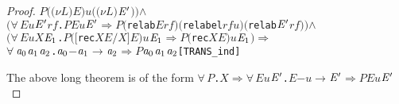 \documentclass[GCNS]{yincog}
\renewcommand{\HOLinline}[1]{\mbox{\textup{\texttt{#1}}}}
\renewcommand{\HOLConst}[1]{\texttt{#1}}
\renewcommand{\HOLBoundVar}[1]{\ensuremath{\mathit{#1}}}
\renewcommand{\HOLFreeVar}[1]{\ensuremath{\mathit{#1}}}
\renewcommand{\HOLSymConst}[1]{#1}
\renewcommand{\HOLTokenConj}{\ensuremath{\wedge}}
\renewcommand{\HOLTokenForall}{\ensuremath{\forall \,}}
\theoremstyle{remark}
\theoremstyle{theorem}
\theoremstyle{remark}
\newcommand{\HOLTokenTransBegin}{$-$}
\newcommand{\HOLTokenTransEnd}{$\rightarrow$\xspace}
\renewcommand{\HOLTokenImp}{\ensuremath{\Longrightarrow}}
\begin{document}
\begin{proof}
\begin{alltt}
            \HOLBoundVar{P} \ensuremath{(}\ensuremath{(\nu}\HOLBoundVar{L}\ensuremath{)} \HOLBoundVar{E}\ensuremath{)} \HOLBoundVar{u} \ensuremath{(}\ensuremath{(\nu}\HOLBoundVar{L}\ensuremath{)} \ensuremath{\HOLBoundVar{E}\sp{\prime}}\ensuremath{)}\ensuremath{)} \HOLSymConst{\HOLTokenConj{}}
       \ensuremath{(}\HOLSymConst{\HOLTokenForall{}}\HOLBoundVar{E} \HOLBoundVar{u} \ensuremath{\HOLBoundVar{E}\sp{\prime}} \HOLBoundVar{rf}. \HOLBoundVar{P} \HOLBoundVar{E} \HOLBoundVar{u} \ensuremath{\HOLBoundVar{E}\sp{\prime}} \HOLSymConst{\HOLTokenImp{}} \HOLBoundVar{P} \ensuremath{(}\HOLConst{relab} \HOLBoundVar{E} \HOLBoundVar{rf}\ensuremath{)} \ensuremath{(}\HOLConst{relabel} \HOLBoundVar{rf} \HOLBoundVar{u}\ensuremath{)} \ensuremath{(}\HOLConst{relab} \ensuremath{\HOLBoundVar{E}\sp{\prime}} \HOLBoundVar{rf}\ensuremath{)}\ensuremath{)} \HOLSymConst{\HOLTokenConj{}}
       \ensuremath{(}\HOLSymConst{\HOLTokenForall{}}\HOLBoundVar{E} \HOLBoundVar{u} \HOLBoundVar{X} \ensuremath{\HOLBoundVar{E}\sb{\mathrm{1}}}. \HOLBoundVar{P} \ensuremath{(}\ensuremath{[}\HOLConst{rec} \HOLBoundVar{X} \HOLBoundVar{E}\ensuremath{/}\HOLBoundVar{X}\ensuremath{]} \HOLBoundVar{E}\ensuremath{)} \HOLBoundVar{u} \ensuremath{\HOLBoundVar{E}\sb{\mathrm{1}}} \HOLSymConst{\HOLTokenImp{}} \HOLBoundVar{P} \ensuremath{(}\HOLConst{rec} \HOLBoundVar{X} \HOLBoundVar{E}\ensuremath{)} \HOLBoundVar{u} \ensuremath{\HOLBoundVar{E}\sb{\mathrm{1}}}\ensuremath{)} \HOLSymConst{\HOLTokenImp{}}
       \HOLSymConst{\HOLTokenForall{}}\ensuremath{\HOLBoundVar{a}\sb{\mathrm{0}}} \ensuremath{\HOLBoundVar{a}\sb{\mathrm{1}}} \ensuremath{\HOLBoundVar{a}\sb{\mathrm{2}}}. \ensuremath{\HOLBoundVar{a}\sb{\mathrm{0}}} \HOLTokenTransBegin\ensuremath{\HOLBoundVar{a}\sb{\mathrm{1}}}\HOLTokenTransEnd \ensuremath{\HOLBoundVar{a}\sb{\mathrm{2}}} \HOLSymConst{\HOLTokenImp{}} \HOLBoundVar{P} \ensuremath{\HOLBoundVar{a}\sb{\mathrm{0}}} \ensuremath{\HOLBoundVar{a}\sb{\mathrm{1}}} \ensuremath{\HOLBoundVar{a}\sb{\mathrm{2}}}\hfill{[TRANS\_ind]}
\end{alltt}
%
The above long theorem is of the form
\HOLinline{\HOLSymConst{\HOLTokenForall{}}\HOLBoundVar{P}.\\\;\HOLFreeVar{X}\\\;\HOLSymConst{\HOLTokenImp{}}\\\;\HOLSymConst{\HOLTokenForall{}}\HOLBoundVar{E}\\\;\HOLBoundVar{u}\\\;\ensuremath{\HOLBoundVar{E}\sp{\prime}}.\\\;\HOLBoundVar{E}\\\;\HOLTokenTransBegin \HOLBoundVar{u}\HOLTokenTransEnd \\\;\ensuremath{\HOLBoundVar{E}\sp{\prime}}\\\;\HOLSymConst{\HOLTokenImp{}}\\\;\HOLBoundVar{P}\\\;\HOLBoundVar{E}\\\;\HOLBoundVar{u}\\\;\ensuremath{\HOLBoundVar{E}\sp{\prime}}}

\end{proof}
\end{document}
